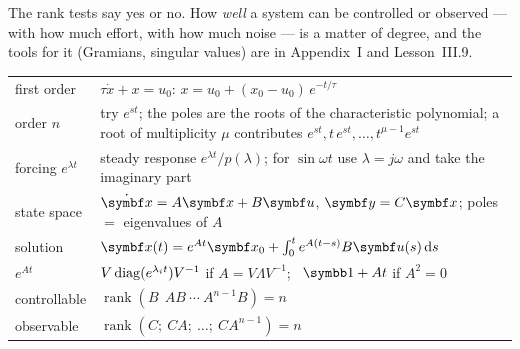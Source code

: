 The rank tests say yes or no. How \emph{well} a system can be controlled or observed — with how much effort, with how much noise — is a matter of degree, and the tools for it (Gramians, singular values) are in Appendix~I and Lesson~III.9.

\begin{result}
\begin{center}\small
\renewcommand{\arraystretch}{1.4}
\begin{tabularx}{\linewidth}{@{}l>{\raggedright\arraybackslash}X@{}}
first order & $\tau\dot x + x = u_0$: \quad $x = u_0 + (x_0 - u_0)\,e^{-t/\tau}$\\
order $n$ & try $e^{st}$; the poles are the roots of the characteristic polynomial; a root of multiplicity $\mu$ contributes $e^{st}, t\,e^{st}, \dots, t^{\mu-1}e^{st}$\\
forcing $e^{\lambda t}$ & steady response $e^{\lambda t}/p(\lambda)$; for $\sin\omega t$ use $\lambda = j\omega$ and take the imaginary part\\
state space & $\dot{\vx} = A\vx + B\symbf u$, $\symbf y = C\vx$; poles $=$ eigenvalues of $A$\\
solution & $\vx(t) = e^{At}\vx_0 + \int_0^t e^{A(t-s)}B\symbf u(s)\,\dd s$\\
$e^{At}$ & $V\operatorname{diag}(e^{\lambda_it})V^{-1}$ if $A = V\Lambda V^{-1}$; \ $\Id + At$ if $A^2 = 0$\\
controllable & $\operatorname{rank}(B\ \ AB\ \cdots\ A^{n-1}B) = n$\\
observable & $\operatorname{rank}(C;\ CA;\ \dots;\ CA^{n-1}) = n$\\
\end{tabularx}
\end{center}
\end{result}
